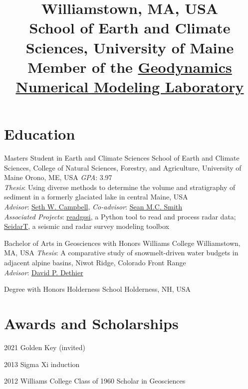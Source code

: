 \documentclass[a4paper,12pt,sans,colorlinks]{moderncv}
\title{%
    \small
    Williamstown, MA, USA
    \\
    School of Earth and Climate Sciences, University of Maine
    \\
    Member of the
    \href{http://wiki.geodynamics.umaine.edu/}{Geodynamics Numerical Modeling Laboratory}
}
\newcommand{\seth}{\href{https://www.alpinesciences.net}{Seth W. Campbell}}
\newcommand{\sean}{\href{https://umaine.edu/earthclimate/people/sean-m-c-smith/}{Sean M.C. Smith}}
\newcommand{\david}{\href{https://geosciences.williams.edu/profile/ddethier/}{David P. Dethier}}
\newcommand{\rsudp}{\href{https://github.com/iannesbitt/readgssi}{readgssi}}
\newcommand{\seidart}{\href{https://github.com/UMainedynamics/SeidarT}{SeidarT}}
\begin{document}

\maketitle
\vspace{-3em}


\section{Education}

{Masters Student in Earth and Climate Sciences}
{School of Earth and Climate Sciences,
College of Natural Sciences, Forestry, and Agriculture,
University of Maine}
{Orono, ME, USA}
{}
{
    \emph{GPA}: 3.97
    \\
    \emph{Thesis}: Using diverse methods to determine the volume and stratigraphy
    of sediment in a formerly glaciated lake in central Maine, USA
    \\
    \emph{Advisor}: \seth{}, \emph{Co-advisor}: \sean{}
    \\
    \emph{Associated Projects}: \rsudp{}, a Python tool to read and process radar data;
    \seidart{}, a seismic and radar survey modeling toolbox
}

{Bachelor of Arts in Geosciences with Honors}
{Williams College}
{Williamstown, MA, USA}
{}
{
    \emph{Thesis}: A comparative study of snowmelt-driven water budgets in
    adjacent alpine basins, Niwot Ridge, Colorado Front Range
    \\
    \emph{Advisor}: \david{}
}

{Degree with Honors}
{Holderness School}
{Holderness, NH, USA}
{}
{}


\section{Awards and Scholarships}

\cvline
{2021}
{Golden Key (invited)}

\cvline
{2013}
{Sigma Xi induction}

\cvline
{2012}
{Williams College Class of 1960 Scholar in Geosciences}
\end{document}
